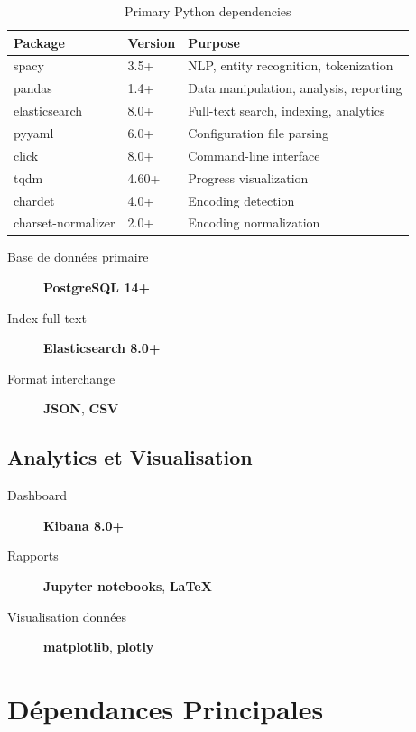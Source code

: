 \documentclass[12pt,a4paper]{report}
\begin{document}
\begin{table}[H]
\centering
\begin{tabular}{|l|l|p{5cm}|}
\hline
\textbf{Package} & \textbf{Version} & \textbf{Purpose} \\
\hline
spacy & 3.5+ & NLP, entity recognition, tokenization \\
pandas & 1.4+ & Data manipulation, analysis, reporting \\
elasticsearch & 8.0+ & Full-text search, indexing, analytics \\
pyyaml & 6.0+ & Configuration file parsing \\
click & 8.0+ & Command-line interface \\
tqdm & 4.60+ & Progress visualization \\
chardet & 4.0+ & Encoding detection \\
charset-normalizer & 2.0+ & Encoding normalization \\
\hline
\end{tabular}
\caption{Primary Python dependencies}
\end{table}

\begin{description}
    \item[Base de données primaire] \textbf{PostgreSQL 14+}
    \item[Index full-text] \textbf{Elasticsearch 8.0+}
    \item[Format interchange] \textbf{JSON}, \textbf{CSV}
\end{description}

\subsection{Analytics et Visualisation}

\begin{description}
    \item[Dashboard] \textbf{Kibana 8.0+}
    \item[Rapports] \textbf{Jupyter notebooks}, \textbf{LaTeX}
    \item[Visualisation données] \textbf{matplotlib}, \textbf{plotly}
\end{description}

\section{Dépendances Principales}
\end{document}
